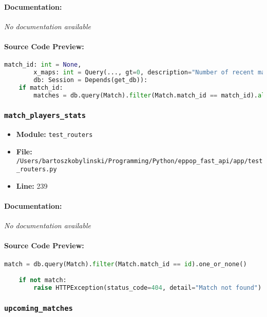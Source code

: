 \documentclass[11pt,a4paper]{article}
\begin{document}
\paragraph{Documentation:} \textit{No documentation available}

\paragraph{Source Code Preview:}
\begin{lstlisting}[language=Python]
        match_id: int = None,
        x_maps: int = Query(..., gt=0, description="Number of recent maps to consider for statistics"),
        db: Session = Depends(get_db)):
    if match_id:
        matches = db.query(Match).filter(Match.match_id == match_id).all()
\end{lstlisting}

\vspace{1em}
\subsubsection{\texttt{match\_players\_stats}}

\begin{itemize}
    \item \textbf{Module:} \texttt{test\_routers}
    \item \textbf{File:} \texttt{/Users/bartoszkobylinski/Programming/Python/eppop\_fast\_api/app/test\_routers.py}
    \item \textbf{Line:} 239
\end{itemize}

\paragraph{Documentation:} \textit{No documentation available}

\paragraph{Source Code Preview:}
\begin{lstlisting}[language=Python]
    match = db.query(Match).filter(Match.match_id == id).one_or_none()

    if not match:
        raise HTTPException(status_code=404, detail="Match not found")

\end{lstlisting}

\vspace{1em}
\subsubsection{\texttt{upcoming\_matches}}
\end{document}
